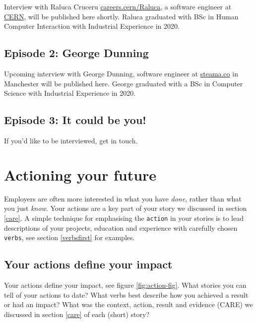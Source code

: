 \documentclass[
]{book}
\begin{document}
Interview with Raluca Cruceru \href{https://careers.cern/Raluca}{careers.cern/Raluca}, a software engineer at \href{https://home.cern/}{CERN}, will be published here shortly. Raluca graduated with BSc in Human Computer Interaction with Industrial Experience in 2020.

\hypertarget{episode-2-george-dunning}{%
\section{Episode 2: George Dunning}\label{episode-2-george-dunning}}

Upcoming interview with George Dunning, software engineer at \href{https://steama.co/}{steama.co} in Manchester will be published here. George graduated with a BSc in Computer Science with Industrial Experience in 2020.

\hypertarget{episode-3-it-could-be-you}{%
\section{Episode 3: It could be you!}\label{episode-3-it-could-be-you}}

If you'd like to be interviewed, get in touch.

\hypertarget{actioning}{%
\chapter{Actioning your future}\label{actioning}}

Employers are often more interested in what you have \emph{done}, rather than what you just \emph{know}. Your actions are a key part of your story we discussed in section \ref{care}. A simple technique for emphasising the \texttt{action} in your stories is to lead descriptions of your projects, education and experience with carefully chosen \texttt{verbs}, see section \ref{verbsfirst} for examples.

\hypertarget{impact}{%
\section{Your actions define your impact}\label{impact}}

Your actions define your impact, see figure \ref{fig:action-fig}. What stories you can tell of your actions to date? What verbs best describe how you achieved a result or had an impact? What was the context, action, result and evidence (CARE) we discussed in section \ref{care} of each (short) story?
\end{document}
